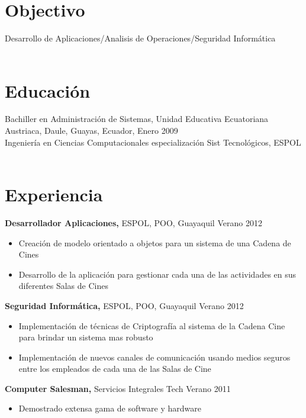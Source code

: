 \documentclass[margin]{res}
\begin{document}
 
\begin{resume} 
 
\section{Objectivo} 
Desarrollo de Aplicaciones/Analisis de Operaciones/Seguridad Informática\\ \\

\section{Educación} 
Bachiller en Administración de Sistemas, Unidad Educativa Ecuatoriana Austriaca, Daule, Guayas, Ecuador, Enero 2009 \\
Ingeniería en Ciencias Computacionales especialización Sist Tecnológicos, ESPOL \\ \\
 

\section{Experiencia}
 {\bf Desarrollador Aplicaciones,} ESPOL, POO, Guayaquil \hfill Verano 2012
 \begin{itemize} \itemsep -2pt  %
 \item Creación de modelo orientado a objetos para un sistema de una Cadena de Cines
 \item Desarrollo de la aplicación para gestionar cada una de las actividades en sus diferentes Salas de Cines
 \end{itemize}

 
 
{\bf Seguridad Informática,} ESPOL, POO, Guayaquil \hfill Verano 2012
\begin{itemize} \itemsep -2pt %
\item Implementación de técnicas de Criptografía al sistema de la Cadena Cine 
	para brindar un sistema mas robusto
\item 	Implementación de nuevos canales de comunicación usando medios seguros
	entre los empleados de cada una de las Salas de Cine

\end{itemize}

{\bf Computer Salesman,} Servicios Integrales Tech\hfill
Verano 2011                
                \begin{itemize} \itemsep -2pt
                 \item  Demostrado extensa gama de software y
                  hardware
                

\end{itemize}
\end{resume}
\end{document}
